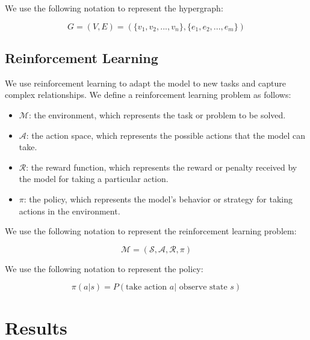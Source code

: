 \documentclass[11pt]{article}
\begin{document}
        We use the following notation to represent the hypergraph:

        \begin{equation}
        G = (V, E) = (\{v_1, v_2,..., v_n\}, \{e_1, e_2,..., e_m\})
        \end{equation}

        \subsection{Reinforcement Learning}

        We use reinforcement learning to adapt the model to new tasks and capture complex relationships. We define a reinforcement learning problem as follows:

        \begin{itemize}

        \item $\mathcal{M}$: the environment, which represents the task or problem to be solved.

        \item $\mathcal{A}$: the action space, which represents the possible actions that the model can take.

        \item $\mathcal{R}$: the reward function, which represents the reward or penalty received by the model for taking a particular action.

        \item $\pi$: the policy, which represents the model's behavior or strategy for taking actions in the environment.

        \end{itemize}

        We use the following notation to represent the reinforcement learning problem:

        \begin{equation}
        \mathcal{M} = (\mathcal{S}, \mathcal{A}, \mathcal{R}, \pi)
        \end{equation}

        We use the following notation to represent the policy:

        \begin{equation}
        \pi(a | s) = P(\text{take action } a | \text{ observe state } s)
        \end{equation}

        \section{Results}
\end{document}

